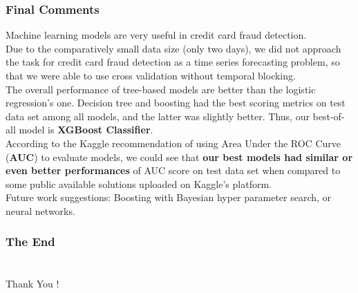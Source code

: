 \documentclass[11pt]{beamer}
\begin{document}
\begin{frame}[fragile]
  \frametitle{\normalsize{\textbf{
    Final Comments
  }}} 

  \scriptsize{  

  \textbullet \: Machine learning models are very useful in credit card 
  fraud detection. \\[0.25cm]

  \textbullet \: Due to the comparatively small data size (only two days), we 
  did not approach the task for credit card fraud detection as a time series 
  forecasting problem, so that we were able to use cross validation without 
  temporal blocking. \\[0.25cm]

  \textbullet \: The overall performance of tree-based models are better than the 
  logistic regression's one. Decision tree and boosting had the best scoring metrics
   on test data set among all models, and the latter was slightly better. Thus, our 
   best-of-all model is \textbf{XGBoost Classifier}. \\[0.25cm]

  \textbullet \: According to the Kaggle recommendation of using Area Under the ROC Curve 
  (\textbf{AUC}) to evaluate models, we could see that 
  \textbf{our best models had similar or even better performances} of AUC score on test 
  data set when compared to some public available solutions uploaded on Kaggle's 
  platform. \\[0.25cm]

  \textbullet \: Future work suggestions: Boosting with Bayesian hyper parameter 
  search, or neural networks.

  }
\end{frame}

\begin{frame}[fragile]
  \frametitle{\normalsize{\textbf{
    The End
  }}} 

  \section{}
  \begin{center}
    \huge{Thank You !}
  \end{center}

\end{frame}

\end{document}
